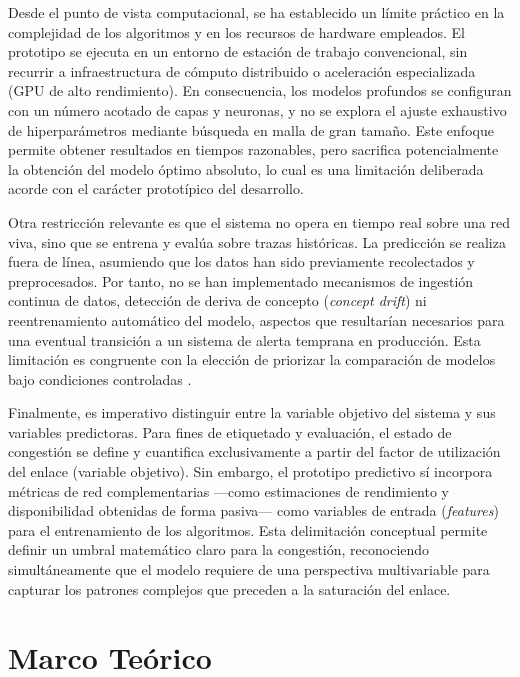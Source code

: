 \documentclass[12pt]{report}
\begin{document}
Desde el punto de vista computacional, se ha establecido un límite práctico en la complejidad de los algoritmos y en los recursos de hardware empleados. El prototipo se ejecuta en un entorno de estación de trabajo convencional, sin recurrir a infraestructura de cómputo distribuido o aceleración especializada (GPU de alto rendimiento). 
En consecuencia, los modelos profundos se configuran con un número acotado de capas y neuronas, y no se explora el ajuste exhaustivo de hiperparámetros mediante búsqueda en malla de gran tamaño. Este enfoque permite obtener resultados en tiempos razonables, pero sacrifica potencialmente la obtención del modelo óptimo absoluto, 
lo cual es una limitación deliberada acorde con el carácter prototípico del desarrollo.

Otra restricción relevante es que el sistema no opera en tiempo real sobre una red viva, sino que se entrena y evalúa sobre trazas históricas. La predicción se realiza fuera de línea, asumiendo que los datos han sido previamente recolectados y preprocesados. Por tanto, no se han implementado mecanismos de ingestión continua de datos, 
detección de deriva de concepto (\textit{concept drift}) ni reentrenamiento automático del modelo, aspectos que resultarían necesarios para una eventual transición a un sistema de alerta temprana en producción. Esta limitación es congruente con la elección de priorizar la comparación de modelos bajo condiciones controladas \cite{zhang2020}.

Finalmente, es imperativo distinguir entre la variable objetivo del sistema y sus variables predictoras. Para fines de etiquetado y evaluación, el estado de congestión se define y cuantifica exclusivamente a partir del factor de utilización del enlace (variable objetivo). Sin embargo, el prototipo predictivo sí incorpora métricas 
de red complementarias ---como estimaciones de rendimiento y disponibilidad obtenidas de forma pasiva--- como variables de entrada (\textit{features}) para el entrenamiento de los algoritmos. Esta delimitación conceptual permite definir un umbral matemático claro para la congestión, reconociendo simultáneamente que el modelo requiere 
de una perspectiva multivariable para capturar los patrones complejos que preceden a la saturación del enlace.
\clearpage

\chapter{Marco Teórico}
\label{cap:marco_teorico}
\end{document}
